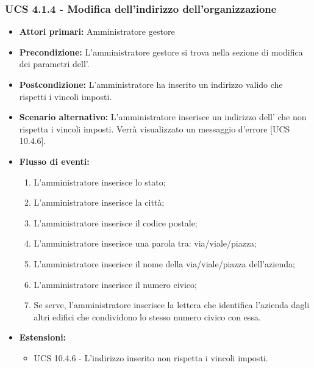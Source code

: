 \subsubsection{UCS 4.1.4 - Modifica dell'indirizzo dell'organizzazione}%

\begin{itemize}
	\item \textbf{Attori primari:} Amministratore gestore
	\item \textbf{Precondizione:} L'amministratore gestore si trova nella sezione di modifica dei parametri dell'.
	\item \textbf{Postcondizione:} L'amministratore ha inserito un indirizzo valido che rispetti i vincoli imposti.
	\item \textbf{Scenario alternativo:} L'amministratore inserisce un indirizzo dell' che non rispetta i vincoli imposti. Verrà visualizzato un messaggio d'errore [UCS 10.4.6].
	\item \textbf{Flusso di eventi:}
	\begin{enumerate}
		\item L'amministratore inserisce lo stato;
		\item L'amministratore inserisce la città;
		\item L'amministratore inserisce il codice postale;
		\item L'amministratore inserisce una parola tra: via/viale/piazza;
		\item L'amministratore inserisce il nome della via/viale/piazza dell'azienda;
		\item L'amministratore inserisce il numero civico;
		\item Se serve, l'amministratore inserisce la lettera che identifica l'azienda dagli altri edifici che condividono lo stesso numero civico con essa.
	\end{enumerate}
	\item \textbf{Estensioni:}
	\begin{itemize}
		\item UCS 10.4.6 - L'indirizzo inserito non rispetta i vincoli imposti.
	\end{itemize}
\end{itemize}


